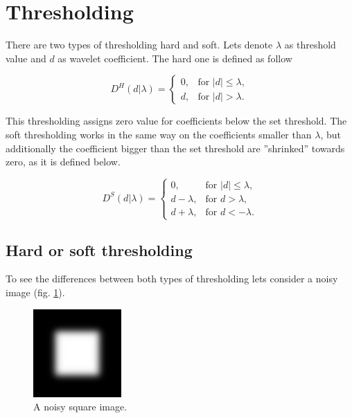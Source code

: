 \section{Thresholding}
\label{sec:threshold}
There are two types of thresholding hard and soft. Lets denote $\lambda$ as threshold value and $d$ as wavelet coefficient. The hard one is defined as follow

\begin{equation}
D^H(d|\lambda)=
\begin{cases}
0, & \text{for } |d| \leq \lambda, \\
d, & \text{for } |d| > \lambda.
\end{cases}
\end{equation}

This thresholding assigns zero value for coefficients below the set threshold. The soft thresholding works in the same way on the coefficients smaller than $\lambda$, but additionally the coefficient bigger than the set threshold are ''shrinked'' towards zero, as it is defined below.

\begin{equation}
D^S(d|\lambda)=
\begin{cases}
	0, & \text{for } |d| \leq \lambda, \\
	d-\lambda, & \text{for } d > \lambda, \\
	d+\lambda, & \text{for } d < -\lambda.
\end{cases}
\end{equation}


\subsection{Hard or soft thresholding}

To see the differences between both types of thresholding lets consider a noisy image (fig. \ref{fig:square_s10}).

\begin{figure}[h]
	\centering
	\includegraphics[width=0.3\textwidth]{graphs/square_s10.png}
	\caption{A noisy square image.}
	\label{fig:square_s10}
\end{figure}

